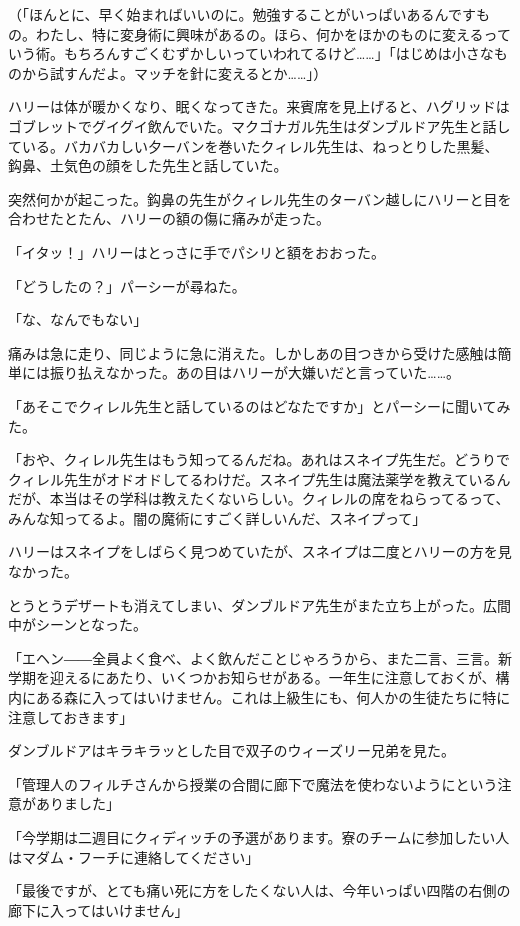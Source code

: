 \documentclass[10pt,a4paper]{article}
\begin{document}
\begin{CJK}{UTF8}{min}
（「ほんとに、早く始まればいいのに。勉強することがいっぱいあるんですもの。わたし、特に変身術に興味があるの。ほら、何かをほかのものに変えるっていう術。もちろんすごくむずかしいっていわれてるけど……」「はじめは小さなものから試すんだよ。マッチを針に変えるとか……」）

ハリーは体が暖かくなり、眠くなってきた。来賓席を見上げると、ハグリッドはゴブレットでグイグイ飲んでいた。マクゴナガル先生はダンブルドア先生と話している。バカバカしい夕ーバンを巻いたクィレル先生は、ねっとりした黒髪、鈎鼻、土気色の顔をした先生と話していた。

突然何かが起こった。鈎鼻の先生がクィレル先生のターバン越しにハリーと目を合わせたとたん、ハリーの額の傷に痛みが走った。

「イタッ！」ハリーはとっさに手でパシリと額をおおった。

「どうしたの？」パーシーが尋ねた。

「な、なんでもない」

痛みは急に走り、同じように急に消えた。しかしあの目つきから受けた感触は簡単には振り払えなかった。あの目はハリーが大嫌いだと言っていた……。

「あそこでクィレル先生と話しているのはどなたですか」とパーシーに聞いてみた。

「おや、クィレル先生はもう知ってるんだね。あれはスネイプ先生だ。どうりでクィレル先生がオドオドしてるわけだ。スネイプ先生は魔法薬学を教えているんだが、本当はその学科は教えたくないらしい。クィレルの席をねらってるって、みんな知ってるよ。闇の魔術にすごく詳しいんだ、スネイプって」

ハリーはスネイプをしばらく見つめていたが、スネイプは二度とハリーの方を見なかった。

とうとうデザートも消えてしまい、ダンブルドア先生がまた立ち上がった。広間中がシーンとなった。

「エヘン――全員よく食べ、よく飲んだことじゃろうから、また二言、三言。新学期を迎えるにあたり、いくつかお知らせがある。一年生に注意しておくが、構内にある森に入ってはいけません。これは上級生にも、何人かの生徒たちに特に注意しておきます」

ダンブルドアはキラキラッとした目で双子のウィーズリー兄弟を見た。

「管理人のフィルチさんから授業の合間に廊下で魔法を使わないようにという注意がありました」

「今学期は二週目にクィディッチの予選があります。寮のチームに参加したい人はマダム・フーチに連絡してください」

「最後ですが、とても痛い死に方をしたくない人は、今年いっぱい四階の右側の廊下に入ってはいけません」


\end{CJK}
\end{document}
